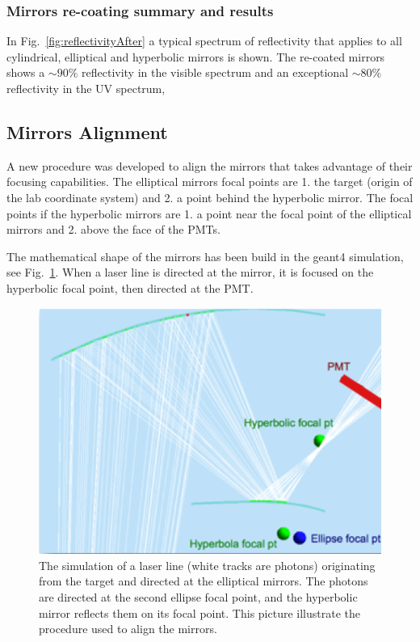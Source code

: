\subsubsection{Mirrors re-coating summary and results}

In Fig.~\ref{fig:reflectivityAfter} a typical spectrum of reflectivity that applies to all cylindrical, elliptical and hyperbolic mirrors is shown.
The re-coated mirrors shows a $\sim 90\%$ reflectivity in the visible spectrum and an exceptional $\sim 80\%$
reflectivity in the UV spectrum,

\subsection{Mirrors Alignment}

A new procedure was developed to align the mirrors that takes advantage of their focusing capabilities. The elliptical mirrors focal points are 1. the target
(origin of the lab coordinate system)
and 2. a point behind the hyperbolic mirror. The focal points if the hyperbolic mirrors are 1. a point near the focal point of the elliptical mirrors and
2. above the face of the PMTs.

The mathematical shape of the mirrors has been build in the geant4 simulation, see Fig.~\ref{fig:alignmentSimulation}. When a laser line is directed at the mirror,
it is focused on the hyperbolic focal point, then directed at the PMT.

\begin{figure}[h]
\centering
	\includegraphics[width=1.0\columnwidth, keepaspectratio]{img/mirrorAlignmentSimulationZoomed.png}
	\caption{The simulation of a laser line (white tracks are photons) originating from the target and directed at the elliptical mirrors. The photons are directed
		      at the second ellipse focal point, and the hyperbolic mirror reflects them on its focal point. This picture illustrate the procedure used to align the mirrors.}
	\label{fig:alignmentSimulation}
\end{figure}

